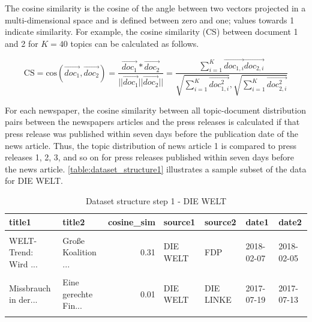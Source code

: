 \documentclass[
  12pt,
]{article}
\begin{document}
The cosine similarity is the cosine of the angle between two vectors
projected in a multi-dimensional space and is defined between zero and
one; values towards 1 indicate similarity. For example, the cosine
similarity (CS) between document 1 and 2 for \(K=40\) topics can be
calculated as follows.

\[
\text{CS} = \text{cos}(\vec{doc_1},\vec{doc_2})=\frac{\vec{doc_1}*\vec{doc_2}}{||\vec{doc_1}||\vec{doc_2}||}=\frac{\sum^K_{i=1} \vec{doc_{1,i}}\vec{doc_{2,i}}}{\sqrt{\sum^K_{i=1} \vec{doc^2_{1,i}}}, \sqrt{\sum^K_{i=1}\vec{doc^2_{2,i}}}}
\]

For each newspaper, the cosine similarity between all topic-document
distribution pairs between the newspapers articles and the press
releases is calculated if that press release was published within seven
days before the publication date of the news article. Thus, the topic
distribution of news article 1 is compared to press releases 1, 2, 3,
and so on for press releases published within seven days before the news
article. \autoref{table:dataset_structure1} illustrates a sample subset
of the data for DIE WELT.

\begin{table}[H]

\caption{\label{tab:Dataset structure 1}Dataset structure step 1 - DIE WELT \label{table:dataset_structure1}}
\centering
\fontsize{7}{9}\selectfont
\begin{tabular}[t]{llrllll}
\toprule
title1 & title2 & cosine\_sim & source1 & source2 & date1 & date2\\
\midrule
\cellcolor{gray!6}{Bundestagswahl 20...} & \cellcolor{gray!6}{Alexander Gauland...} & \cellcolor{gray!6}{0.33} & \cellcolor{gray!6}{DIE WELT} & \cellcolor{gray!6}{AfD} & \cellcolor{gray!6}{2017-09-25} & \cellcolor{gray!6}{2017-09-19}\\
WELT-Trend: Wird ... & Große Koalition ... & 0.31 & DIE WELT & FDP & 2018-02-07 & 2018-02-05\\
\cellcolor{gray!6}{Befangenheit fest...} & \cellcolor{gray!6}{Der Bundestag bes...} & \cellcolor{gray!6}{0.07} & \cellcolor{gray!6}{DIE WELT} & \cellcolor{gray!6}{SPD} & \cellcolor{gray!6}{2017-06-25} & \cellcolor{gray!6}{2017-06-23}\\
Missbrauch in der... & Eine gerechte Fin... & 0.01 & DIE WELT & DIE LINKE & 2017-07-19 & 2017-07-13\\
\cellcolor{gray!6}{\#CheckdieWahl: „W...} & \cellcolor{gray!6}{Paul Hampel: Dipl...} & \cellcolor{gray!6}{0.23} & \cellcolor{gray!6}{DIE WELT} & \cellcolor{gray!6}{AfD} & \cellcolor{gray!6}{2017-09-22} & \cellcolor{gray!6}{2017-09-22}\\
\bottomrule
\end{tabular}
\end{table}
\end{document}
